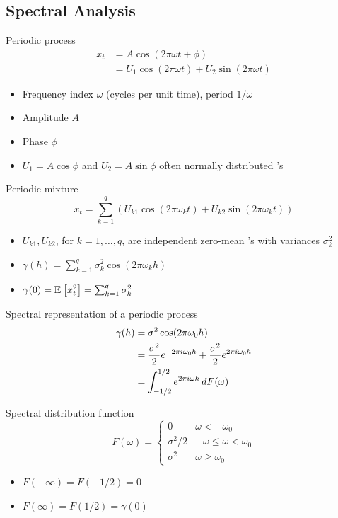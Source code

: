 \documentclass[landscape]{article}
\begin{document}
\begin{multicols*}{2}
\subsection{Spectral Analysis}

Periodic process
\begin{align*}
  x_t
  &= A \cos(2\pi\omega t + \phi) \\
  &= U_1 \cos(2\pi \omega t) + U_2 \sin(2\pi \omega t)
\end{align*}

\begin{itemize}
  \item Frequency index $\omega$ (cycles per unit time),
    period $1/\omega$
  \item Amplitude $A$
  \item Phase $\phi$
  \item $U_1 = A\cos\phi$ and $U_2 = A\sin\phi$ often normally distributed \rv's
\end{itemize}

Periodic mixture
\[x_t = \sum_{k=1}^q\left( U_{k1}\cos(2\pi\omega_k t)
+ U_{k2}\sin(2\pi\omega_k t)
\right)\]
\begin{itemize}
  \item $U_{k1}, U_{k2}$, for $k=1,\ldots,q$,
    are independent zero-mean \rv's with variances $\sigma_k^2$
  \item $\gamma(h) = \sum_{k=1}^q \sigma_k^2 \cos(2\pi\omega_k h)$
  \item $\gamma(0) = \mathbb{E}_{}\left[x_t^2\right] = \sum_{k=1}^q \sigma_k^2$
\end{itemize}

Spectral representation of a periodic process
\begin{align*}
\gamma(h)
&= \sigma^2 \cos(2\pi\omega_0 h) \\
&= \frac{\sigma^2}{2} e^{-2\pi i \omega_0 h}
+ \frac{\sigma^2}{2} e^{2\pi i \omega_0 h}\\
&= \int_{-1/2}^{1/2} e^{2\pi i \omega h} \,dF(\omega)
\end{align*}

Spectral distribution function
\[F(\omega)= \begin{cases}
  0 & \omega < -\omega_0 \\
  \sigma^2/2 & -\omega \le \omega < \omega_0 \\
  \sigma^2 & \omega \ge \omega_0
\end{cases}\]
\begin{itemize}
  \item $F(-\infty) = F(-1/2) = 0$
  \item $F(\infty) = F(1/2) = \gamma(0)$
\end{itemize}


\end{multicols*}
\end{document}
